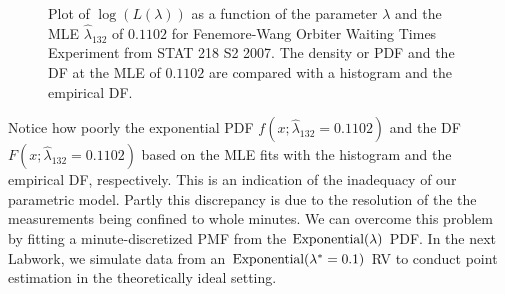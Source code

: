 \begin{figure}[htpb]
\caption{Plot of $\log(L(\lambda))$ as a function of the parameter $\lambda$  and the MLE $\widehat{\lambda}_{132}$ of $0.1102$ for Fenemore-Wang Orbiter Waiting Times Experiment from STAT 218 S2 2007.  The density or PDF and the DF at the MLE of $0.1102$ are compared with a histogram and the empirical DF.\label{F:ExponentialMLEOrbiter}}
\centering   {}
\end{figure}
Notice how poorly the exponential PDF $f(x;\widehat{\lambda}_{132}=0.1102)$ and the DF $F(x;\widehat{\lambda}_{132}=0.1102)$ based on the MLE fits with the histogram and the empirical DF, respectively.  This is an indication of the inadequacy of our parametric model.  Partly this discrepancy is due to the resolution of the the measurements being confined to whole minutes.  We can overcome this problem by fitting a minute-discretized PMF from the $\mbox{{\rm Exponential}}(\lambda)$ PDF.  In the next Labwork, we simulate data from an $\mbox{{\rm Exponential}}(\lambda^*=0.1)$ RV to conduct point estimation in the theoretically ideal setting. 

